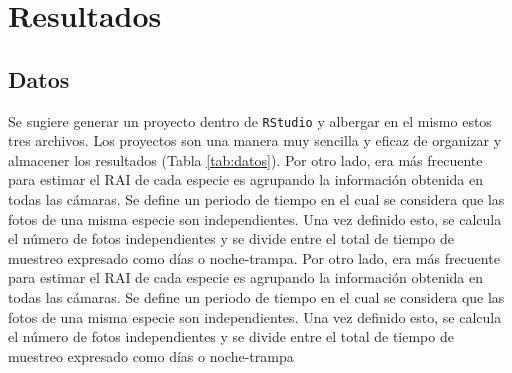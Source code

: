 \documentclass[
  11pt,
]{book}
\begin{document}
\chapter{Resultados}\label{resultados}

\section{Datos}\label{datos}

Se sugiere generar un proyecto dentro de \texttt{RStudio} y albergar en el mismo estos tres archivos. Los proyectos son una manera muy sencilla y eficaz de organizar y almacener los resultados (Tabla \ref{tab:datos}). Por otro lado, era más frecuente para estimar el RAI de cada especie es agrupando la información obtenida en todas las cámaras. Se define un periodo de tiempo en el cual se considera que las fotos de una misma especie son independientes. Una vez definido esto, se calcula el número de fotos independientes y se divide entre el total de tiempo de muestreo expresado como días o noche-trampa. Por otro lado, era más frecuente para estimar el RAI de cada especie es agrupando la información obtenida en todas las cámaras. Se define un periodo de tiempo en el cual se considera que las fotos de una misma especie son independientes. Una vez definido esto, se calcula el número de fotos independientes y se divide entre el total de tiempo de muestreo expresado como días o noche-trampa
\end{document}
